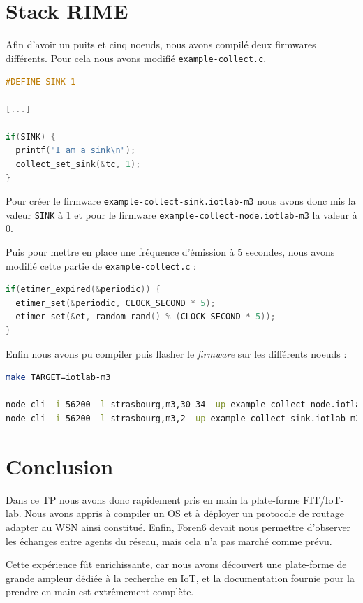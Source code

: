 \documentclass[	DIV=calc,%
							paper=a4,%
							fontsize=11pt,%
			  ]{scrartcl}	 					%
\begin{document}
\section{Stack RIME}

Afin d'avoir un puits et cinq noeuds, nous avons compilé deux firmwares différents. Pour cela nous avons modifié \texttt{example-collect.c}. 

\begin{lstlisting}[language=C]
#DEFINE SINK 1

[...]

if(SINK) {
  printf("I am a sink\n");
  collect_set_sink(&tc, 1);
}
\end{lstlisting}

Pour créer le firmware \texttt{example-collect-sink.iotlab-m3} nous avons donc mis la valeur \texttt{SINK} à 1 et pour le firmware \texttt{example-collect-node.iotlab-m3} la valeur à 0.


Puis pour mettre en place une fréquence d'émission à 5 secondes, nous avons modifié cette partie de \texttt{example-collect.c} :

\begin{lstlisting}[language=C]
if(etimer_expired(&periodic)) {
  etimer_set(&periodic, CLOCK_SECOND * 5);
  etimer_set(&et, random_rand() % (CLOCK_SECOND * 5));
}
\end{lstlisting}

Enfin nous avons pu compiler puis flasher le \textit{firmware} sur les différents noeuds :

\begin{lstlisting}[language=bash]
make TARGET=iotlab-m3

node-cli -i 56200 -l strasbourg,m3,30-34 -up example-collect-node.iotlab-m3 
node-cli -i 56200 -l strasbourg,m3,2 -up example-collect-sink.iotlab-m3 
\end{lstlisting}

\section{Conclusion}
Dans ce TP nous avons donc rapidement pris en main la plate-forme FIT/IoT-lab. Nous avons appris à compiler un OS et à déployer un protocole de routage adapter au WSN ainsi constitué. Enfin, Foren6 devait nous permettre d'observer les échanges entre agents du réseau, mais cela n'a pas marché comme prévu.

Cette expérience fût enrichissante, car nous avons découvert une plate-forme de grande ampleur dédiée à la recherche en IoT, et la documentation fournie pour la prendre en main est extrêmement complète.
\end{document}
